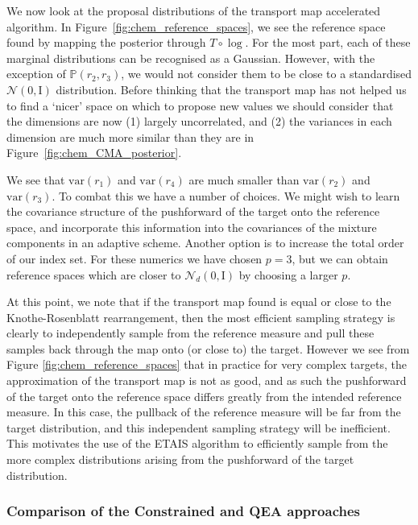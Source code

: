 \documentclass[final]{siamltex}
\newcommand{\edit}[1]{#1}
\begin{document}
\edit{
We now look at the proposal distributions of the transport map accelerated algorithm. In Figure~\ref{fig:chem_reference_spaces}, we see the reference space found by mapping the posterior through $T\circ\log$.} For the most part, each of these marginal distributions can be recognised as a Gaussian. However, with the exception of $\mathbb{P}(r_2,r_3)$, we would not consider them to be close to a standardised $\mathcal{N}(0, \text{I})$ distribution. Before thinking that the transport map has not helped us to find a `nicer' space on which to propose new values we should consider that the dimensions are now (1) largely uncorrelated, and (2) the variances in each dimension are much more similar than they are in Figure~\ref{fig:chem_CMA_posterior}.


\edit{We see that
$\text{var}(r_1)$ and $\text{var}(r_4)$ are much smaller than
$\text{var}(r_2)$ and $\text{var}(r_3)$. To combat this we have a
number of choices.} We might wish to learn the covariance structure of
the pushforward of the target onto the reference space, and
incorporate this information into the covariances of the mixture
components in an adaptive scheme. Another option is to increase the
total order of our index set. For these numerics we have chosen $p=3$,
but we can obtain reference spaces which are closer to
$\mathcal{N}_d(0, \text{I})$ by choosing a larger $p$.

\edit{At this point, we note that if the transport map found is equal
  or close to the Knothe-Rosenblatt rearrangement, then the most
  efficient sampling strategy is clearly to independently sample from the
  reference measure and pull these samples back through the map onto
  (or close to) the target. However we see from Figure
  \ref{fig:chem_reference_spaces} that in practice for very complex
  targets, the approximation of the transport map is not as good, and
  as such the pushforward of the target onto the reference
  space differs greatly from the intended reference measure. In
  this case, the pullback of the reference measure will be far from
  the target distribution, and this independent sampling strategy
  will be inefficient. This motivates the use of the ETAIS algorithm
  to efficiently sample from the more complex distributions arising
  from the pushforward of the target distribution. %
  }

\subsubsection{Comparison of the Constrained and QEA approaches}
\end{document}
